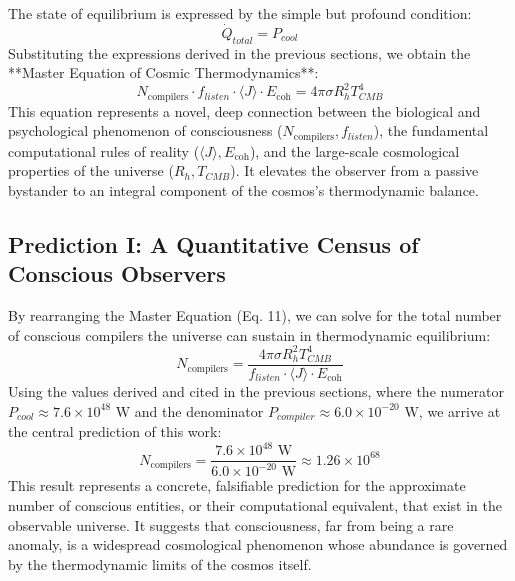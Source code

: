 \documentclass[12pt, aip, jcp]{revtex4-2} %
\begin{document}
The state of equilibrium is expressed by the simple but profound condition:
\begin{equation}
    \dot{Q}_{total} = P_{cool}
\end{equation}
Substituting the expressions derived in the previous sections, we obtain the **Master Equation of Cosmic Thermodynamics**:
\begin{equation}
    \boxed{N_{\text{compilers}} \cdot f_{listen} \cdot \langle J \rangle \cdot E_{\text{coh}} = 4 \pi \sigma R_h^2 T_{CMB}^4}
\end{equation}
This equation represents a novel, deep connection between the biological and psychological phenomenon of consciousness (\(N_{\text{compilers}}, f_{listen}\)), the fundamental computational rules of reality (\(\langle J \rangle, E_{\text{coh}}\)), and the large-scale cosmological properties of the universe (\(R_h, T_{CMB}\)). It elevates the observer from a passive bystander to an integral component of the cosmos's thermodynamic balance.

\subsection{Prediction I: A Quantitative Census of Conscious Observers}

By rearranging the Master Equation (Eq. 11), we can solve for the total number of conscious compilers the universe can sustain in thermodynamic equilibrium:
\begin{equation}
    N_{\text{compilers}} = \frac{4 \pi \sigma R_h^2 T_{CMB}^4}{f_{listen} \cdot \langle J \rangle \cdot E_{\text{coh}}}
\end{equation}
Using the values derived and cited in the previous sections, where the numerator \(P_{cool} \approx 7.6 \times 10^{48} \text{ W}\) and the denominator \(P_{compiler} \approx 6.0 \times 10^{-20} \text{ W}\), we arrive at the central prediction of this work:
\begin{equation}
    N_{\text{compilers}} = \frac{7.6 \times 10^{48} \text{ W}}{6.0 \times 10^{-20} \text{ W}} \approx 1.26 \times 10^{68}
\end{equation}
This result represents a concrete, falsifiable prediction for the approximate number of conscious entities, or their computational equivalent, that exist in the observable universe. It suggests that consciousness, far from being a rare anomaly, is a widespread cosmological phenomenon whose abundance is governed by the thermodynamic limits of the cosmos itself.
\end{document}
